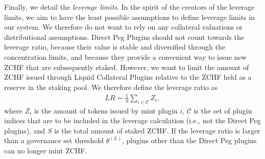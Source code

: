 \documentclass[english,11pt]{article}
\begin{document}
Finally, we detail the \emph{leverage limits}. In the spirit of the
creators of the leverage limits, we aim to have the least possible assumptions
to define leverage limits in our system. We therefore do not want to rely on any 
collateral valuations or distributional assumptions.
Direct Peg Plugins should not count towards the leverage ratio,
because their value is stable and diversified through the concentration limits,
and because they provide a convenient way to issue new 
ZCHF that are subsequently staked. However, we want to limit the
amount of ZCHF issued through Liquid Collateral Plugins relative to the ZCHF
held as a reserve in the staking pool. We therefore define the leverage ratio
as
\begin{align}
LR = \frac{1}{S}\sum_{i \in \mathcal{C}} Z_i,
\end{align}
where $Z_i$ is the amount of tokens issued by mint plugin $i$, $\mathcal{C}$
is the set of plugin indices that are to be included in the leverage
calculation (i.e., not the Direct Peg plugins), and $S$ is the total amount
of staked ZCHF. If the leverage ratio is larger than a governance set threshold $\theta^{(L)}$,
plugins other than the Direct Peg plugins can no longer mint ZCHF.
\end{document}
